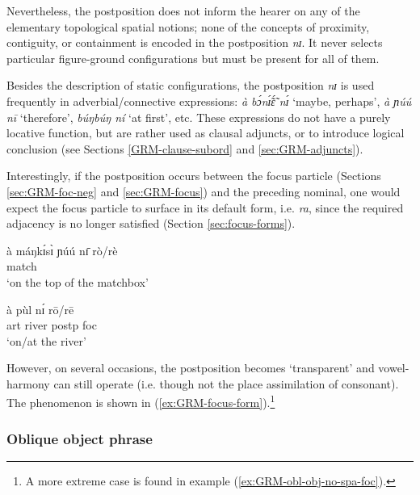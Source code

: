 \begin{exe}
\begin{exe}
\begin{exe}
{Nevertheless, the postposition does not inform the hearer on any of the 
elementary topological spatial notions; none of the concepts of proximity, 
contiguity, or containment is encoded in  the postposition {\it nɪ}. It never 
selects particular figure-ground configurations but must be present for all of 
them. 

Besides the description of static configurations, the postposition {\it nɪ}  is 
used frequently in adverbial/connective expressions: {\it à bɔ́nɪ̃́ɛ̃́ nɪ́} 
`maybe, perhaps', {\it à ɲúú nī} `therefore', {\it búŋbúŋ ní} `at 
first', etc. These expressions do not have a purely locative function, but are 
rather used as clausal adjuncts,  or to introduce logical conclusion (see 
Sections   \ref{GRM-clause-subord} and \ref{sec:GRM-adjuncts}). 



Interestingly, if the postposition  occurs between the focus particle 
(Sections \ref{sec:GRM-foc-neg} and \ref{sec:GRM-focus}) 
and
the preceding nominal, one would expect  the focus particle to surface in its
default form, i.e. {\it ra},  since the required adjacency is no longer 
satisfied
(Section  \ref{sec:focus-forms}). 


\ea\label{ex:GRM-focus-form}

\ea\label{ex:GRM-foc-form-X}
 
\ex\label{ex:GRM-foc-form-1}
\gll  à máŋkɪ́sɪ̀ ɲúú nɪ̄ rò/rè \\
       {\art} {match} {\reln} {\postp} {\foc}\\
\glt `on the top of the matchbox'

\ex\label{ex:GRM-foc-form-2}
\gll  à  pùl nɪ́ rō/rē \\
       {\sc art} {river} {\sc postp}  {\sc foc}\\
\glt `on/at the river'

\z 
 \z

However, on several occasions, the postposition becomes `transparent' and 
vowel-harmony can still operate (i.e. though not the place 
assimilation of consonant). The
phenomenon is shown in (\ref{ex:GRM-focus-form}).\footnote{A more extreme case
is found in example (\ref{ex:GRM-obl-obj-no-spa-foc}).}



\subsubsection{Oblique object phrase}
\label{sec:GRM-obl-phrase}

}
\end{exe}
\end{exe}
\end{exe}
